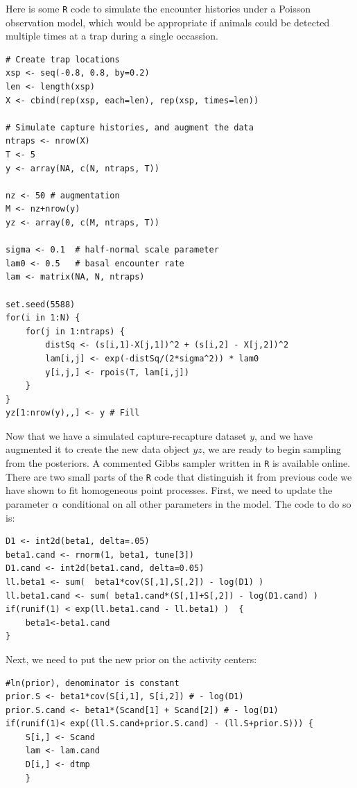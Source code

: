 Here is some \verb+R+ code to simulate the encounter histories under a
Poisson observation model, which would be appropriate if animals could
be detected multiple times at a trap during a single occassion. 

\begin{small}
\begin{verbatim}
# Create trap locations
xsp <- seq(-0.8, 0.8, by=0.2)
len <- length(xsp)
X <- cbind(rep(xsp, each=len), rep(xsp, times=len))

# Simulate capture histories, and augment the data
ntraps <- nrow(X)
T <- 5
y <- array(NA, c(N, ntraps, T))

nz <- 50 # augmentation
M <- nz+nrow(y)
yz <- array(0, c(M, ntraps, T))

sigma <- 0.1  # half-normal scale parameter
lam0 <- 0.5   # basal encounter rate
lam <- matrix(NA, N, ntraps)

set.seed(5588)
for(i in 1:N) {
    for(j in 1:ntraps) {
        distSq <- (s[i,1]-X[j,1])^2 + (s[i,2] - X[j,2])^2
        lam[i,j] <- exp(-distSq/(2*sigma^2)) * lam0
        y[i,j,] <- rpois(T, lam[i,j])
    }
}
yz[1:nrow(y),,] <- y # Fill
\end{verbatim}
\end{small}

Now that we have a simulated capture-recapture dataset $y$, and we have
augmented it to create the new data object $yz$, we are ready to
begin sampling from the posteriors. A commented Gibbs sampler written
in \verb+R+ is available online. There are two small parts of the
\verb+R+ code that distinguish it from previous code we have shown to
fit homogeneous point processes. First, we need to update the parameter
${\bf \alpha}$ conditional on all other parameters in the model. The code to
do so is: 

\begin{small}
\begin{verbatim}
D1 <- int2d(beta1, delta=.05)
beta1.cand <- rnorm(1, beta1, tune[3])
D1.cand <- int2d(beta1.cand, delta=0.05)
ll.beta1 <- sum(  beta1*cov(S[,1],S[,2]) - log(D1) )
ll.beta1.cand <- sum( beta1.cand*(S[,1]+S[,2]) - log(D1.cand) )
if(runif(1) < exp(ll.beta1.cand - ll.beta1) )  {
    beta1<-beta1.cand
}
\end{verbatim}
\end{small}

Next, we need to put the new prior on the activity centers:

\begin{small}
\begin{verbatim}
#ln(prior), denominator is constant
prior.S <- beta1*cov(S[i,1], S[i,2]) # - log(D1)
prior.S.cand <- beta1*(Scand[1] + Scand[2]) # - log(D1)
if(runif(1)< exp((ll.S.cand+prior.S.cand) - (ll.S+prior.S))) {
    S[i,] <- Scand
    lam <- lam.cand
    D[i,] <- dtmp
    }
\end{verbatim}
\end{small}

